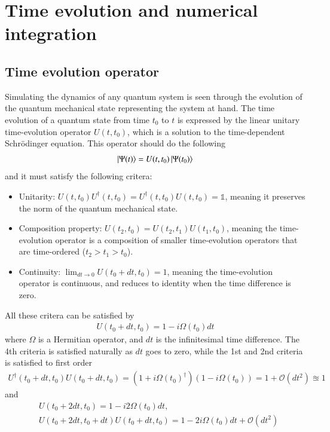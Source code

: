 \documentclass{subfiles}
\begin{document}
\section{Time evolution and numerical integration}
\subsection*{Time evolution operator}
Simulating the dynamics of any quantum system is seen through the evolution of the quantum mechanical state representing the system at hand. The time evolution of a quantum state from time $t_0$ to $t$ is expressed by the linear unitary time-evolution operator $U(t, t_0)$, which is a solution to the time-dependent Schrödinger equation.\cite{sakurai1986modern} This operator should do the following
\begin{equation}
    \ket{\Psi(t)} = U(t, t_0)\ket{\Psi(t_0)}
\end{equation}
and it must satisfy the following critera:
\begin{itemize}
    \item Unitarity: $U(t, t_0)U^\dagger(t, t_0) = U^\dagger(t, t_0)U(t, t_0) = \mathbb{1}$, meaning it preserves the norm of the quantum mechanical state.
    \item Composition property: $U(t_2, t_0) = U(t_2, t_1)U(t_1, t_0)$, meaning the time-evolution operator is a composition of smaller time-evolution operators that are time-ordered ($t_2>t_1>t_0$).
    \item Continuity: $\lim_{dt\to 0}U(t_0 + dt, t_0) = \mathcal{1}$, meaning the time-evolution operator is continuous, and reduces to identity when the time difference is zero.
\end{itemize}
All these critera can be satisfied by 
\begin{align*}
    U(t_0 + dt, t_0) = 1 - i\Omega(t_0) dt
\end{align*}
where $\Omega$ is a Hermitian operator, and $dt$ is the infinitesimal time difference. The 4th criteria is satisfied naturally as $dt$ goes to zero, while the 1st and 2nd criteria is satisfied to first order 
\begin{align*}
    U^\dagger(t_0 + dt, t_0)U(t_0 + dt, t_0) = (1 + i\Omega(t_0)^\dagger)(1 - i\Omega(t_0)) = 1 + \mathcal{O}(dt^2) \approxeq 1
\end{align*}
and
\begin{align*}
    &U(t_0 + 2dt, t_0) = 1 - i2\Omega(t_0)dt, \\
    &U(t_0 + 2dt, t_0 +dt)U(t_0 + dt, t_0) = 1 - 2i\Omega(t_0)dt + \mathcal{O}(dt^2)
\end{align*}
\end{document}
